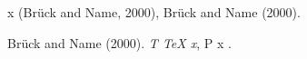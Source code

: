 x (Br{\"u}ck {and} \alpha{} Name, 2000), Br{\"u}ck {and} \alpha{} Name (2000).

\noindent
Br{\"u}ck {and} \alpha{} Name (2000). \emph{T {\TeX} \alpha{} x}, P {x} \beta{}.
